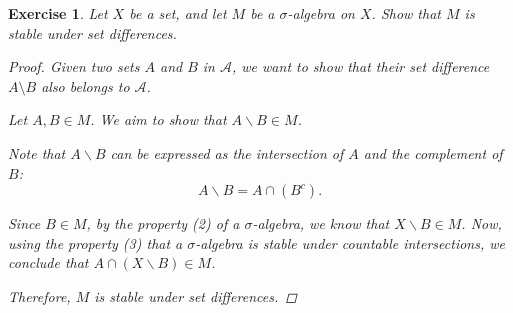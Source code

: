 \documentclass{article}
\newtheorem{exercise}{Exercise}
\begin{document}
    \begin{exercise}
        Let $X$ be a set, and let $M$ be a $\sigma$-algebra on $X$. Show that $M$ is stable under set differences.

    \begin{proof}
       Given two sets $A$ and $B$ in $\mathcal{A}$, we want to show that their set difference $A \setminus B$ also belongs to $\mathcal{A}$.

Let \(A, B \in M\). We aim to show that \(A \backslash B \in M\).

Note that \(A \backslash B\) can be expressed as the intersection of \(A\) and the complement of \(B\):
\[
A \backslash B = A \cap (B^c).
\]

Since \(B \in M\), by the property (2) of a \(\sigma\)-algebra, we know that \(X \backslash B \in M\). Now, using the property (3) that a \(\sigma\)-algebra is stable under countable intersections, we conclude that \(A \cap (X \backslash B) \in M\).

Therefore, \(M\) is stable under set differences.

    \end{proof}
    \end{exercise}
\end{document}
